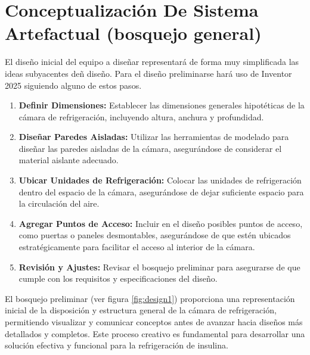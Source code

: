 \section{Conceptualización De Sistema Artefactual (bosquejo general)}
El diseño inicial del equipo a diseñar representará de forma muy simplificada las ideas subyacentes deñ diseño. Para el diseño preliminarse hará uso de Inventor 2025 siguiendo alguno de estos pasos.
\begin{enumerate}
	\item \textbf{Definir Dimensiones:} Establecer las dimensiones generales hipotéticas de la cámara de refrigeración, incluyendo altura, anchura y profundidad.
	\item \textbf{Diseñar Paredes Aisladas:} Utilizar las herramientas de modelado para diseñar las paredes aisladas de la cámara, asegurándose de considerar el material aislante adecuado.
	\item \textbf{Ubicar Unidades de Refrigeración:} Colocar las unidades de refrigeración dentro del espacio de la cámara, asegurándose de dejar suficiente espacio para la circulación del aire.
	\item \textbf{Agregar Puntos de Acceso:} Incluir en el diseño posibles puntos de acceso, como puertas o paneles desmontables, asegurándose de que estén ubicados estratégicamente para facilitar el acceso al interior de la cámara.
	\item \textbf{Revisión y Ajustes:} Revisar el bosquejo preliminar para asegurarse de que cumple con los requisitos y especificaciones del diseño.
\end{enumerate}

El bosquejo preliminar (ver figura \ref{fig:design1}) proporciona una representación inicial de la disposición y estructura general de la cámara de refrigeración, permitiendo visualizar y comunicar conceptos antes de avanzar hacia diseños más detallados y completos. Este proceso creativo es fundamental para desarrollar una solución efectiva y funcional para la refrigeración de insulina.



